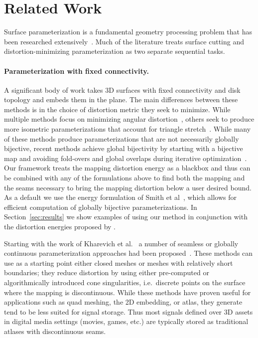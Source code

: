
\section{Related Work}
Surface parameterization is a fundamental geometry processing problem that has been researched extensively~\cite{Sheffer07_ParameterizationSurvey,Hormann2008}.
Much of the literature treats surface cutting and distortion-minimizing parameterization as two separate sequential tasks. 

\paragraph{Parameterization with fixed connectivity.}
A significant body of work takes 3D surfaces with fixed connectivity and disk topology and embeds them in the plane.  The main differences between these methods is in the choice of distortion metric they seek to minimize.  While multiple methods focus on minimizing angular distortion~\cite{Floater2003,Sheffer2005ABFPP,Levy2002,Aigerman2015,Sawhney:2017}, 
others seek to produce more isometric parameterizations that account for triangle stretch~\cite{Sander2001Texture,Hormann2000MIPS,Rabinovich2017,Zhu2017BCQN,Shtengel:GOvCM:2017,claici2017isometry}. While many of these methods produce parameterizations that are not necessarily globally bijective, recent methods achieve global bijectivity by starting with a bijective map and avoiding fold-overs and global overlaps during iterative optimization~\cite{Smith2015Bijective,Jiang2017Simplicial}.
Our framework treats the mapping distortion energy as a blackbox and thus can be combined with any of the formulations above to find both the mapping and the seams necessary to bring the mapping distortion below a user desired bound. As a default we use the energy formulation of Smith et al~, which allows for efficient computation of globally bijective parameterizations.  
In Section~\ref{sec:results} we show examples of using our method in conjunction with the distortion energies proposed by .
%
 

Starting with the work of Kharevich et al.~ a number of seamless or globally continuous parameterization approaches had been proposed~\cite{pgp,others}. These methods can use as a starting point either closed meshes or meshes with relatively short boundaries; they reduce distortion by using either pre-computed or algorithmically introduced cone singularities, i.e.\ discrete points on the surface where the mapping is discontinuous. While these methods have proven useful for applications such as quad meshing, the 2D embedding, or atlas, they generate tend to be less suited for signal storage. Thus most signals defined over 3D assets in digital media settings (movies, games, etc.) are typically stored as traditional atlases with discontinuous seams.  

